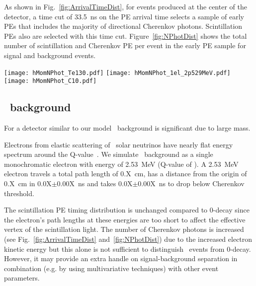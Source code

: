 As shown in Fig.~\ref{fig:ArrivalTimeDist}, for events produced at the center of the detector, a time cut of 33.5~ns on the PE arrival 
time selects a sample of early PEs that includes the majority of directional Cherenkov photons. Scintillation PEs also are 
selected with this time cut. Figure~\ref{fig:NPhotDist} shows the total number of scintillation and Cherenkov PE per event in the early 
PE sample for signal and background events.



\begin{figure*}[ht]
  \centering
  \texttt{[image: hMomNPhot\_Te130.pdf]}
  \texttt{[image: hMomNPhot\_1el\_2p529MeV.pdf]}
  \texttt{[image: hMomNPhot\_C10.pdf]}
  \caption{Early PE sample composition: number of Cherenkov (\emph{dashed red line}), scintillation
    (\emph{dotted blue line}), and total (\emph{solid black line}) PEs per event
    for the simulation of 1000 $^{130}$Te 0\nbb-decay events (\emph{left panel}),
    1000 $^8$B events (\emph{middle panel}), and 4152 \C~events (\emph{right panel}).}
\label{fig:NPhotDist}
\end{figure*}



\subsection{\B~background}

For a detector similar to our model \B~background is significant due to large mass.

Electrons from elastic scattering of \B~solar neutrinos have nearly flat energy spectrum around the 
Q-value~\cite{SNOp-B8-bkg}. We simulate \B~background as a single monochromatic electron with energy of 2.53~MeV 
(Q-value of \Te). A 2.53~MeV electron travels a total path length of 0.X~cm, has a distance from the origin of 0.X~cm in 
0.0X$\pm$0.00X~ns  and takes 0.0X$\pm$0.00X~ns to drop below Cherenkov threshold.

The scintillation PE timing distribution is unchanged compared to 0\nbb-decay since the electron's path lengths at these energies 
are too short to affect the effective vertex of the scintillation light. The number of Cherenkov photons is increased 
(see Fig.~\ref{fig:ArrivalTimeDist} and~\ref{fig:NPhotDist}) due to the increased electron kinetic energy but this alone is not 
sufficient to distinguish \B~events from 0\nbb-decay. However, it may provide an extra handle on signal-background separation in 
combination (e.g. by using multivariative techniques) with other event parameters.




